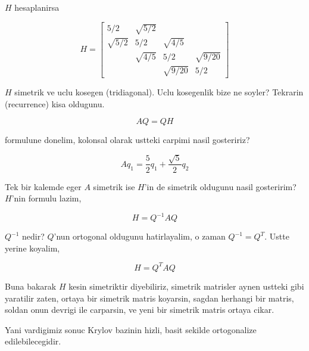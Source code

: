 \documentclass[12pt,fleqn]{article}\usepackage{../common}
\begin{document}
$H$ hesaplanirsa

\[  H = 
\left[\begin{array}{rrrr}
5/2 & \sqrt{ 5/2} && \\
\sqrt{ 5/2} & 5/2 & \sqrt{ 4/5}& \\
 & \sqrt{ 4/5} & 5/2 & \sqrt{ 9/20}\\
 &&  \sqrt{ 9/20} & 5/2 
\end{array}\right]
\]

$H$ simetrik ve uclu kosegen (tridiagonal). Uclu kosegenlik bize ne
soyler?  Tekrarin (recurrence) kisa oldugunu.

\[ AQ = QH \]

formulune donelim, kolonsal olarak ustteki carpimi nasil gosteririz? 

\[ Aq_1  = \frac{ 5}{2}q_1  + \frac{ \sqrt{ 5}}{2} q_2 \]

Tek bir kalemde eger $A$ simetrik ise $H$'in de simetrik oldugunu nasil
gosteririm? $H$'nin formulu lazim, 

\[ H = Q^{-1}AQ \]

$Q^{-1}$ nedir? $Q$'nun ortogonal oldugunu hatirlayalim, o zaman 
$Q^{-1} =
Q^T$. Ustte yerine koyalim,

\[ H = Q^{T}AQ \]

Buna bakarak $H$ kesin simetriktir diyebiliriz, simetrik matrisler aynen
ustteki gibi yaratilir zaten, ortaya bir simetrik matris koyarsin, sagdan
herhangi bir matris, soldan onun devrigi ile carparsin, ve yeni bir
simetrik matris ortaya cikar. 

Yani vardigimiz sonuc Krylov bazinin hizli, basit sekilde ortogonalize
edilebilecegidir. 
\end{document}
